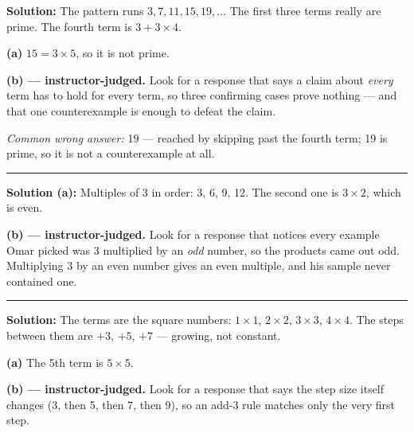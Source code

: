 \documentclass[12pt]{article}
\begin{document}
\textbf{Solution:} The pattern runs $3, 7, 11, 15, 19, \ldots$ The first three terms really are prime. The fourth term is $3 + 3 \times 4$.

\textbf{(a)} $15 = 3 \times 5$, so it is not prime. 

\textbf{(b) --- instructor-judged.} Look for a response that says a claim about \emph{every} term has to hold for every term, so three confirming cases prove nothing --- and that one counterexample is enough to defeat the claim.

\emph{Common wrong answer:} 19 --- reached by skipping past the fourth term; 19 is prime, so it is not a counterexample at all.

\vspace{0.2cm}\noindent\rule{\linewidth}{0.2pt}\vspace{0.2cm}


\textbf{Solution (a):} Multiples of 3 in order: 3, 6, 9, 12. The second one is $3 \times 2$, which is even. 

\textbf{(b) --- instructor-judged.} Look for a response that notices every example Omar picked was 3 multiplied by an \emph{odd} number, so the products came out odd. Multiplying 3 by an even number gives an even multiple, and his sample never contained one.

\vspace{0.2cm}\noindent\rule{\linewidth}{0.2pt}\vspace{0.2cm}


\textbf{Solution:} The terms are the square numbers: $1 \times 1$, $2 \times 2$, $3 \times 3$, $4 \times 4$. The steps between them are $+3$, $+5$, $+7$ --- growing, not constant.

\textbf{(a)} The 5th term is $5 \times 5$. 

\textbf{(b) --- instructor-judged.} Look for a response that says the step size itself changes (3, then 5, then 7, then 9), so an add-3 rule matches only the very first step.
\end{document}
